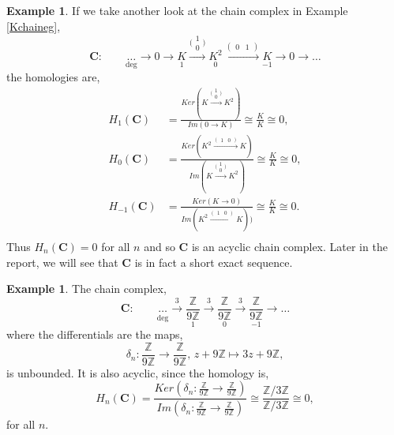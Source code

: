 \documentclass[11.5pt, twoside, a4paper, titlepage]{report}
\providecommand{\equ}[0]{\begin{equation*}}
\providecommand{\eequ}[0] {\end{equation*}}
\providecommand{\bb}[1]{\mathbb{#1}}
\theoremstyle{definition}
\newtheorem{eg}[mydef]{Example}
\theoremstyle{plain}
\begin{document}
\begin{eg}
If we take another look at the chain complex in Example \ref{Kchaineg},
\equ
\mathbf{C}: \qquad \underset{\text{deg}}{\dots} \xrightarrow{} 0 \xrightarrow{} \underset{1}{K} \xrightarrow{\big(\begin{smallmatrix} 1\\ 0 \end{smallmatrix}\big)} \underset{0}{K^2} \xrightarrow{(\begin{smallmatrix}0 & 1 \end{smallmatrix})}\underset{-1}{K} \xrightarrow{} 0 \xrightarrow{} \dots
\eequ
the homologies are, 
\begin{align*}
H_1(\mathbf{C}) &=\frac{Ker(K\xrightarrow{\big(\begin{smallmatrix} 1\\ 0 \end{smallmatrix}\big)}K^2)}{Im(0 \xrightarrow{}K)}\cong \frac{K}{K} \cong 0,\\
H_0(\mathbf{C}) &=\frac{Ker(K^2\xrightarrow{(\begin{smallmatrix} 1 & 0 \end{smallmatrix})}K)}{Im(K\xrightarrow{\big(\begin{smallmatrix} 1\\ 0 \end{smallmatrix}\big)}K^2)}\cong \frac{K}{K} \cong 0,\\
H_{-1}(\mathbf{C}) &=\frac{Ker(K\xrightarrow{}0)}{Im(K^2\xrightarrow{(\begin{smallmatrix} 1 & 0 \end{smallmatrix})}K))}\cong \frac{K}{K} \cong 0.\\
\end{align*}
Thus $H_n(\mathbf{C})=0$ for all $n$ and so $\mathbf{C}$ is an acyclic chain complex. Later in the report, we will see that $\mathbf{C}$ is in fact a short exact sequence.
\end{eg}

\begin{eg}
The chain complex,
\equ
\mathbf{C}: \qquad \underset{\text{deg}}{\underset{}{\dots}} \xrightarrow{3}\underset{1}{\frac{\bb{Z}}{9\bb{Z}}} \xrightarrow{3}\underset{0}{\frac{\bb{Z}}{9\bb{Z}}} \xrightarrow{3}\underset{-1}{\frac{\bb{Z}}{9\bb{Z}}} \xrightarrow{} \dots
\eequ
where the differentials are the maps,
\equ
\delta_n:\frac{\bb{Z}}{9\bb{Z}}\xrightarrow{}\frac{\bb{Z}}{9\bb{Z}}\text{, } z+9\bb{Z}\mapsto 3z+9\bb{Z},
\eequ
is unbounded. It is also acyclic, since the homology is,
\equ
H_n(\mathbf{C})=\frac{Ker(\delta_n:\frac{\bb{Z}}{9\bb{Z}}\xrightarrow{}\frac{\bb{Z}}{9\bb{Z}})}{Im(\delta_n:\frac{\bb{Z}}{9\bb{Z}}\xrightarrow{}\frac{\bb{Z}}{9\bb{Z}})}\cong \frac{\bb{Z}/3\bb{Z}}{\bb{Z}/3\bb{Z}} \cong 0, 
\eequ
for all $n$.
\end{eg}
\end{document}
